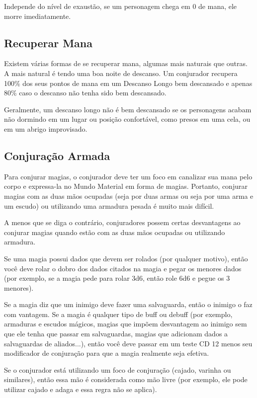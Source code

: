 \documentclass{RPG_Adventure}[2021/10/20]
\begin{document}
\begin{multicols}{2}
Independe do nível de exaustão, se um personagem chega em $0$ de mana, ele
morre imediatamente.

\subsection*{Recuperar Mana}%
\label{sub:recuperar_mana}

Existem várias formas de se recuperar mana, algumas mais naturais que outras.
A mais natural é tendo uma boa noite de descanso. Um conjurador recupera 100\%
dos seus pontos de mana em um Descanso Longo bem descansado e apenas 80\% caso o
descanso não tenha sido bem descansado.

Geralmente, um descanso longo não é bem descansado se os personagens acabam não
dormindo em um lugar ou posição confortável, como presos em uma cela, ou em um
abrigo improvisado.

\subsection*{Conjuração Armada}%

Para conjurar magias, o conjurador deve ter um foco em canalizar sua mana pelo
corpo e expressa-la no Mundo Material em forma de magias. Portanto, conjurar
magias com as duas mãos ocupadas (seja por duas armas ou seja por uma arma e um
escudo) ou utilizando uma armadura pesada é muito mais difícil.

A menos que se diga o contrário, conjuradores possem certas desvantagens ao
conjurar magias quando estão com as duas mãos ocupadas ou utilizando armadura.

Se uma magia possui dados que devem ser rolados (por qualquer motivo), então você
deve rolar o dobro dos dados citados na magia e pegar os menores dados (por
exemplo, se a magia pede para rolar 3d6, então role 6d6 e pegue os 3 menores).

Se a magia diz que um inimigo deve fazer uma salvaguarda, então o inimigo o faz
com vantagem. Se a magia é qualquer tipo de buff ou debuff (por exemplo,
armaduras e escudos mágicos, magias que impõem desvantagem ao inimigo sem que ele
tenha que passar em salvaguardas, magias que adicionam dados a salvaguardas de
aliados...), então você deve passar em um teste CD 12 menos seu modificador de
conjuração para que a magia realmente seja efetiva.

Se o conjurador está utilizando um foco de conjuração (cajado, varinha ou
similares), então essa mão é considerada como mão livre (por exemplo, ele pode
utilizar cajado e adaga e essa regra não se aplica).


\end{multicols}
\end{document}
